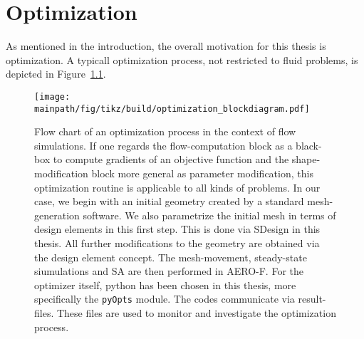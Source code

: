 \documentclass[../main.tex]{subfiles}
\begin{document}
\setlength{\delimitershortfall}{0pt}
\chapter{Optimization}\label{sec:optimization}
\minitoc


As mentioned in the introduction, the overall motivation for this thesis is optimization. A typicall optimization process, not restricted to fluid problems, is depicted in Figure~\ref{fig:optimization_blockdiagram}.
\begin{figure}[h!]
	\begin{center}
        \texttt{[image: \\mainpath/fig/tikz/build/optimization\_blockdiagram.pdf]}
        \caption[Optimization scheme: block-diagram]{Flow chart of an optimization process in the context of flow simulations. If one regards the flow-computation block as a black-box to compute gradients of an objective function and the shape-modification block more general as parameter modification, this optimization routine is applicable to all kinds of problems. In our case, we begin with an initial geometry created by a standard mesh-generation software. We also parametrize the initial mesh in terms of design elements in this first step. This is done via SDesign\cite{SDesign} in this thesis. All further modifications to the geometry are obtained via the design element concept. The mesh-movement, steady-state siumulations and \acf{SA} are then performed in AERO-F\cite{Aerof}. For the optimizer itself, python has been chosen in this thesis, more specifically the \texttt{pyOpts} module. The codes communicate via result-files. These files are used to monitor and investigate the optimization process.}
		\label{fig:optimization_blockdiagram}
    \end{center}
\end{figure}

\end{document}
